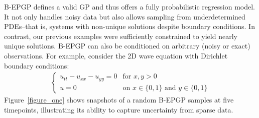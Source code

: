 \documentclass{article} %
\theoremstyle{plain}
\theoremstyle{definition}
\theoremstyle{remark}
\begin{document}
B-EPGP defines a valid GP and thus offers a fully probabilistic regression model. It not only handles noisy data but also allows sampling from underdetermined PDEs--that is, systems with non-unique solutions despite boundary conditions. In contrast, our previous examples were sufficiently constrained to yield nearly unique solutions. B-EPGP can also be conditioned on arbitrary (noisy or exact) observations. For example, consider the 2D wave equation with Dirichlet boundary conditions:
\begin{align*}
\begin{cases}
    u_{tt}-u_{xx}-u_{yy}=0&\text{for }x,y>0\\
    u=0&\text{on }x\in\{0,1\}\text{ and }y\in\{0,1\}
\end{cases}    
\end{align*}
Figure~\ref{figure_one} shows snapshots of a random B-EPGP samples at five timepoints, illustrating its ability to capture uncertainty from sparse data.
\end{document}
